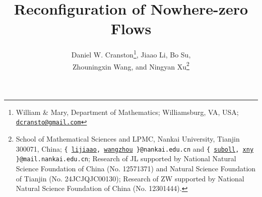 \documentclass[a4paper,12pt]{article}
\theoremstyle{plain}
\theoremstyle{definition}
\begin{document}
\title{Reconfiguration of Nowhere-zero Flows}
\renewcommand{\thefootnote}{\fnsymbol{footnote}}

\newcommand{\nankaiaffil}{School of Mathematical Sciences and LPMC, Nankai University, Tianjin 300071, China; \texttt{\{%
\href{mailto:lijiaao@nankai.edu.cn}{lijiaao}, %
\href{mailto:wangzhou@nankai.edu.cn}{wangzhou}%
    \}@nankai.edu.cn} and 
    \texttt{\{%
\href{mailto:suboll@mail.nankai.edu.cn}{suboll},%
\href{mailto:xny@mail.nankai.edu.cn}{xny}%
  \}@mail.nankai.edu.cn};
    Research of JL supported by National Natural Science Foundation of China (No. 12571371) and Natural Science Foundation of Tianjin (No. 24JCJQJC00130); Research of ZW supported by National Natural Science Foundation of China (No. 12301444).}

\author{\normalsize
  Daniel W. Cranston\thanks{William \& Mary, Department of Mathematics; Williamsburg, VA, USA; 
 \texttt{
\href{mailto:dcransto@gmail.com}{dcransto@gmail.com}}}, 
  Jiaao Li\textsuperscript{\textdagger}, 
  Bo Su\textsuperscript{\textdagger},\\ 
  Zhouningxin Wang\textsuperscript{\textdagger}, 
  and 
  Ningyan Xu\thanks{\nankaiaffil}
}
\renewcommand{\thefootnote}{\arabic{footnote}}
\setcounter{footnote}{0}
\end{document}

